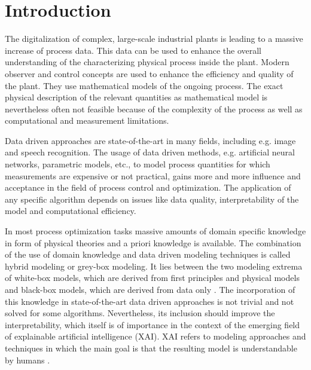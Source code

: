 \chapter{Introduction} \label{cha:introduction}

The digitalization of complex, large-scale industrial plants is leading to a massive increase of process data. This data can be used to enhance the overall understanding of the characterizing physical process inside the plant. Modern observer and control concepts are used to enhance the efficiency and quality  of the plant. They use mathematical models of the ongoing process. The exact physical description of the relevant quantities as mathematical model is nevertheless often not feasible because of the complexity of the process as well as computational and measurement limitations.

Data driven approaches are state-of-the-art in many fields, including e.g. image and speech recognition. The usage of data driven methods, e.g. artificial neural networks, parametric models, etc., to model process quantities for which measurements are expensive or not practical, gains more and more influence and acceptance in the field of process control and optimization. The application of any specific algorithm depends on issues like data quality, interpretability of the model and computational efficiency. 

In most process optimization tasks massive amounts of domain specific knowledge in form of physical theories and a priori knowledge is available. The combination of the use of domain knowledge and data driven modeling techniques is called hybrid modeling or grey-box modeling. It lies between the two modeling extrema of white-box models, which are derived from first principles and physical models and black-box models, which are derived from data only \cite{ashby1961introduction}. The incorporation of this knowledge in state-of-the-art data driven approaches is not trivial and not solved for some algorithms. Nevertheless, its inclusion should improve the interpretability, which itself is of importance in the context of the emerging field of explainable artificial intelligence (XAI). XAI refers to modeling approaches and techniques in which the main goal is that the resulting model is understandable by humans \cite{dovsilovic2018explainable}.

